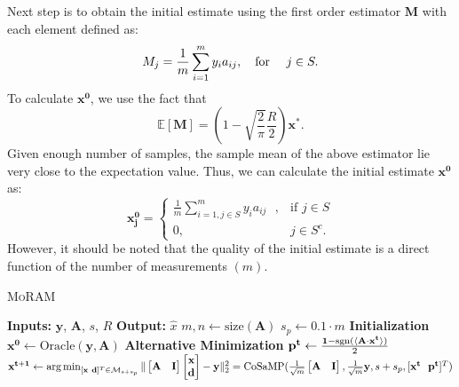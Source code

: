 Next step is to obtain the initial estimate using the first order estimator $\mathbf{M}$ with each element defined as:
$$
M_{j} = \frac{1}{m}\sum_{i=1}^{m}y_{i}a_{ij},~~~\textnormal{for}~~~~j \in S.
$$
To calculate $\mathbf{{x}^0}$, we use the fact that
$$
\mathbb{E}[\mathbf{M}] = \left( 1 - \sqrt{\frac{2}{\pi}}\frac{R}{2} \right) \mathbf{{x}^*}.
$$
Given enough number of samples, the sample mean of the above estimator lie very close to the expectation value. Thus, we can calculate the initial estimate $\mathbf{{x}^0}$ as:
\begin{equation}
	\mathbf{{x}^0_j} = 
	\begin{cases}
	\frac{1}{m}\sum_{i=1, j \in S}^{m}y_{i}a_{ij}~~~,& \text{if } j \in S \\
	0,              & j \in S^c.
	\end{cases}
	\label{eq:init}
\end{equation}
However, it should be noted that the quality of the initial estimate is a direct function of the number of measurements $(m)$. 


\begin{algorithm}[H]
	\caption{\textsc{MoRAM}}
	\label{alg:DMF}
	\begin{algorithmic}
		\State\textbf{Inputs:} $\mathbf{y}$, $\mathbf{A}$, $s$, $R$
		\State\textbf{Output:}  $\widehat{x}$
		\State $m,n \leftarrow \mathrm{size}(\mathbf{A})$ 
		\State $s_p \leftarrow 0.1\cdot m$
		\State \textbf{Initialization}
		\State $\mathbf{x^0} \leftarrow \textrm{Oracle}(\mathbf{y, A})$ 
		\State \textbf{Alternative Minimization}
		\State $\mathbf{{p}^{t}} \leftarrow \frac{\mathbf{1}-\mathrm{sgn}(\langle \mathbf{A} \cdot \mathbf{x^t} \rangle)}{2}$
		\State $\mathbf{{x}^{t+1}}\leftarrow \operatorname*{arg\,min}_{[\mathbf{x~d}]^T \in \mathcal{M}_{s+s_p}}\|\begin{bmatrix} \mathbf{A} & \mathbf{I} \end{bmatrix} \begin{bmatrix} \mathbf{x} \\ \mathbf{d} \end{bmatrix} - \mathbf{y}\|_2^2 = \mathrm{CoSaMP}(\frac{1}{\sqrt{m}}\begin{bmatrix} \mathbf{A} & \mathbf{I} \end{bmatrix},\frac{1}{\sqrt{m}}\mathbf{y},s+s_p,[\mathbf{x^t~~p^t}]^T)$
		\EndFor
	\end{algorithmic}
\end{algorithm}

